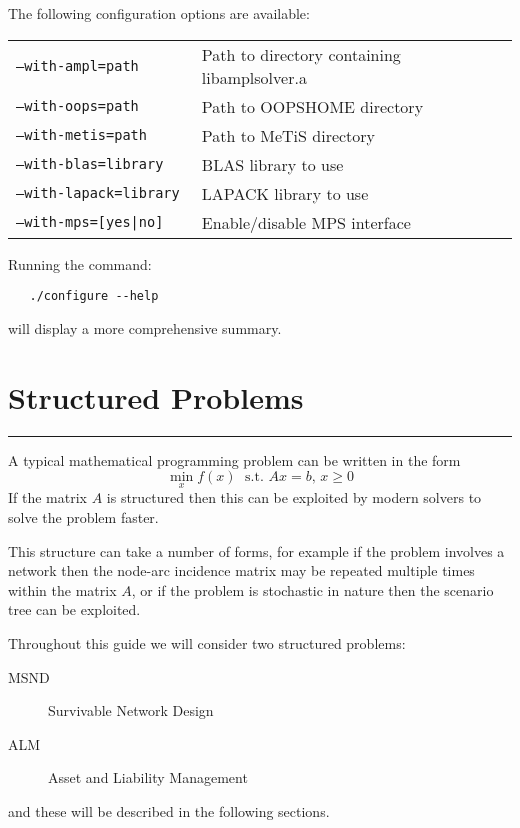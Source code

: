 \documentclass[10pt,a4paper]{book}
\begin{document}
The following configuration options are available:

\begin{tabular}{ll}
   \tt --with-ampl=path & Path to directory containing libamplsolver.a \\
   \tt --with-oops=path & Path to OOPSHOME directory \\
   \tt --with-metis=path & Path to MeTiS directory \\
   \tt --with-blas=library & BLAS library to use \\
   \tt --with-lapack=library & LAPACK library to use \\
   \tt --with-mps=[yes|no] & Enable/disable MPS interface
\end{tabular}

\noindent Running the command:
\begin{verbatim}
   ./configure --help
\end{verbatim}
will display a more comprehensive summary.

\chapter{Structured Problems}
\vspace{-0.6cm}\rule{\textwidth}{0.4ex}\vspace{0.1cm}
\label{background}

A typical mathematical programming problem can be written in the form
\begin{equation}
\min_x f(x)\; \text{~s.t.~} Ax=b,\, x\ge 0
\end{equation}
If the matrix $A$ is structured then this can be exploited by modern solvers
to solve the problem faster.

This structure can take a number of forms, for example if the problem involves
a network then the node-arc incidence matrix may be repeated multiple times
within the matrix $A$, or if the problem is stochastic in nature then the
scenario tree can be exploited.

Throughout this guide we will consider two structured problems:
\begin{description}
   \item[MSND] Survivable Network Design
   \item[ALM] Asset and Liability Management
\end{description}
and these will be described in the following sections.
\end{document}
